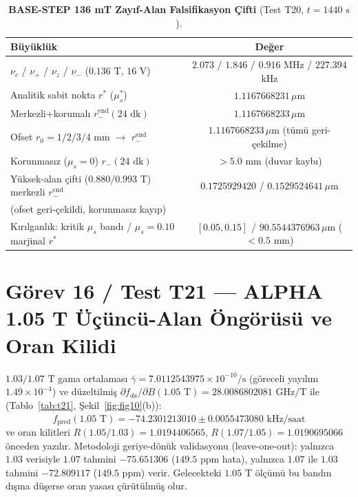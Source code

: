 \documentclass[12pt,a4paper]{article}
\begin{document}
\begin{table}[!htbp]
\centering
\footnotesize
\setlength{\tabcolsep}{3pt}
\caption{\textbf{BASE-STEP 136 mT Zayıf-Alan Falsifikasyon Çifti} (Test T20, $t=1440\text{ s}$).}
\label{tab:t20}
\vspace{0.1cm}
\begin{tabular}{@{}l|c@{}}
\hline
Büyüklük & Değer \\
\hline
$\nu_c$ / $\nu_+$ / $\nu_z$ / $\nu_-$ ($0.136$ T, $16$ V) & $2.073$ / $1.846$ / $0.916$ MHz / $227.394$ kHz \\
Analitik sabit nokta $r^*$ ($\mu_s^*$) & $1.1167668231\,\mu\text{m}$ \\
Merkezli+korumalı $r_-^{\mathrm{end}}(24\text{ dk})$ & $1.1167668233\,\mu\text{m}$ \\
Ofset $r_0=1/2/3/4\text{ mm}$ $\to$ $r_-^{\mathrm{end}}$ & $1.1167668233\,\mu\text{m}$ (tümü geri-çekilme) \\
Korunmasız ($\mu_s=0$) $r_-(24\text{ dk})$ & $>5.0$ mm (duvar kaybı) \\
Yüksek-alan çifti ($0.880/0.993$ T) merkezli $r_-^{\mathrm{end}}$ & $0.1725929420$ / $0.1529524641\,\mu\text{m}$ \\
(ofset geri-çekildi, korunmasız kayıp) & \\
Kırılganlık: kritik $\mu_s$ bandı / $\mu_s=0.10$ marjinal $r^*$ & $[0.05, 0.15]$ / $90.5544376963\,\mu\text{m}$ ($<0.5$ mm) \\
\hline
\end{tabular}
\end{table}

\section{Görev 16 / Test T21 --- ALPHA 1.05 T Üçüncü-Alan Öngörüsü ve Oran Kilidi}

$1.03/1.07\text{ T}$ gama ortalaması $\bar{\gamma}=7.0112543975\times 10^{-10}\text{/s}$ (göreceli yayılım $1.49\times 10^{-4}$) ve düzeltilmiş $\partial f_{da}/\partial B(1.05\text{ T})=28.0086802081\text{ GHz/T}$ ile (Tablo~\ref{tab:t21}, Şekil~\ref{fig:fig10}(b)):
\begin{equation}
\boxed{\dot{f}_{\mathrm{pred}}(1.05\text{ T}) = -74.2301213010 \pm 0.0055473080\text{ kHz/saat}}
\label{eq:t21pred}
\end{equation}
ve oran kilitleri $R(1.05/1.03)=1.0194406565$, $R(1.07/1.05)=1.0190695066$ önceden yazılır. Metodoloji geriye-dönük validasyonu (leave-one-out): yalnızca $1.03$ verisiyle $1.07$ tahmini $-75.651306$ ($149.5\text{ ppm}$ hata), yalnızca $1.07$ ile $1.03$ tahmini $-72.809117$ ($149.5\text{ ppm}$) verir. Gelecekteki $1.05\text{ T}$ ölçümü bu bandın dışına düşerse oran yasası çürütülmüş olur.
\end{document}
